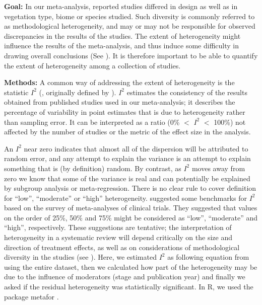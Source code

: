 



\noindent\textbf{Goal:} In our meta-analysis, reported studies differed in design as well as in vegetation type, biome or species studied. Such diversity is commonly referred to as methodological heterogeneity, and may or may not be responsible for observed discrepancies in the results of the studies. The extent of heterogeneity might influence the results of the meta-analysis, and thus induce some difficulty in drawing overall conclusions (See \citealt{Higgins:2002iq}). It is therefore important to be able to quantify the extent of heterogeneity among a collection of studies.

\noindent\textbf{Methods:} A common way of addressing the extent of heterogeneity is the statistic $I^{2}$ (\citealt{Santos:2012gt}, originally defined by \citealt{Higgins:2002iq}). $I^{2}$ estimates the consistency of the results obtained from published studies used in our meta-analysis; it describes the percentage of variability in point estimates that is due to heterogeneity rather than sampling error. It can be interpreted as a ratio (0\% $<$ $I^{2}$ $<$ 100\%) not affected by the number of studies or the metric of the effect size in the analysis.

An $I^{2}$ near zero indicates that almost all of the dispersion will be attributed to random error, and any attempt to explain the variance is an attempt to explain something that is (by definition) random. By contrast, as $I^{2}$ moves away from zero we know that some of the variance is real and can potentially be explained by subgroup analysis or meta-regression.
There is no clear rule to cover definition for ``low'', ``moderate'' or ``high'' heterogeneity. \citealt{Higgins:2003hz} suggested some benchmarks for $I^{2}$ based on the survey of meta-analyses of clinical trials. They suggested that values on the order of 25\%, 50\% and 75\% might be considered as ``low'', ``moderate'' and ``high'', respectively. These suggestions are tentative; the interpretation of heterogeneity in a systematic review will depend critically on the size and direction of treatment effects, as well as on considerations of methodological diversity in the studies (see \citealt{Borenstein:2009um}).
Here, we estimated $I^{2}$ as following equation from \citealt{Higgins:2002iq} using the entire dataset, then we calculated how part of the heterogeneity may be due to the influence of moderators (stage and publication year) and finally we asked if the residual heterogeneity was statistically significant. In R, we used the package metafor  \citep{Viechtbauer-2010}.


